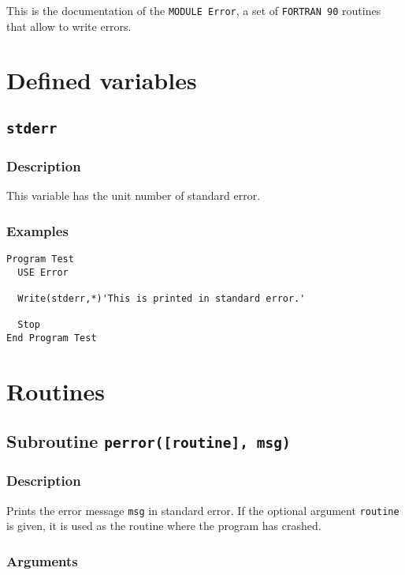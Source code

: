 This is the documentation of the \texttt{MODULE Error}, a set
of \texttt{FORTRAN 90} routines that allow to write errors.


\section{Defined variables}

\subsection{\texttt{stderr}}

\subsubsection{Description}

This variable has the unit number of standard error.

\subsubsection{Examples}

\begin{verbatim}
Program Test
  USE Error

  Write(stderr,*)'This is printed in standard error.'

  Stop
End Program Test
\end{verbatim}

\section{Routines}

\subsection{Subroutine \texttt{perror([routine], msg)}}

\subsubsection{Description}

Prints the error message \texttt{msg} in standard error. If the
optional argument \texttt{routine} is given, it is used as the routine
where the program has crashed.

\subsubsection{Arguments}

